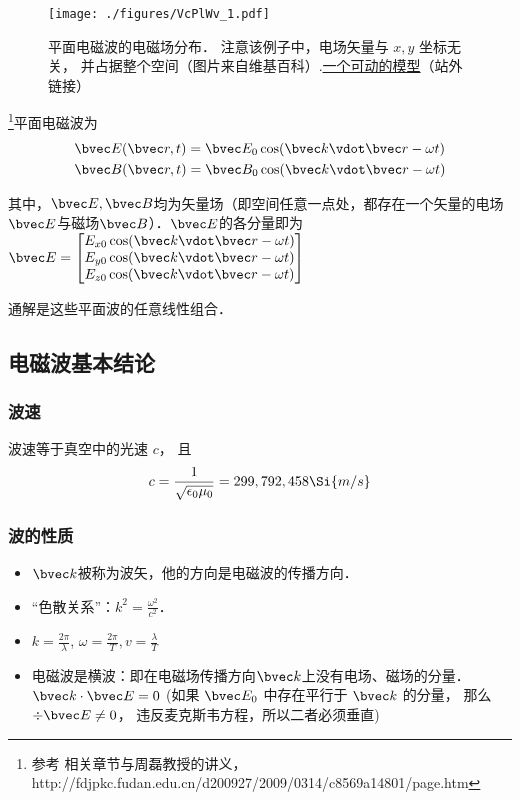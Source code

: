 

\begin{figure}[ht]
\centering
\texttt{[image: ./figures/VcPlWv\_1.pdf]}
\caption{平面电磁波的电磁场分布． 注意该例子中，电场矢量与 $x, y$ 坐标无关， 并占据整个空间（图片来自维基百科）.\href{https://www.geogebra.org/m/xhYwXSsH}{一个可动的模型}（站外链接）} \label{VcPlWv_fig1}
\end{figure}

\footnote{参考 \cite{GriffE} 相关章节与周磊教授的讲义，http://fdjpkc.fudan.edu.cn/d200927/2009/0314/c8569a14801/page.htm}平面电磁波为
\begin{align}
&\bvec E(\bvec r, t) = \bvec E_0 \cos(\bvec k\vdot \bvec r - \omega t)\\
&\bvec B(\bvec r, t) = \bvec B_0 \cos(\bvec k \vdot \bvec r - \omega t)
\end{align}

其中，$\bvec E, \bvec B$均为矢量场（即空间任意一点处，都存在一个矢量的电场$\bvec E$与磁场$\bvec B$）．$\bvec E$的各分量即为
$\bvec E = 
\begin{bmatrix}
E_{x0} \cos(\bvec k\vdot \bvec r - \omega t)\\
E_{y0} \cos(\bvec k\vdot \bvec r - \omega t)\\
E_{z0} \cos(\bvec k\vdot \bvec r - \omega t)\\
\end{bmatrix}
$

通解是这些平面波的任意线性组合． 

\subsection{电磁波基本结论}
\subsubsection{波速}
波速等于真空中的光速 $c$， 且
\begin{equation}\label{VcPlWv_eq1}
c = \frac{1}{\sqrt{\epsilon_0\mu_0}} = 299,792,458 \Si{m/s}
\end{equation}

\subsubsection{波的性质}
\begin{itemize}
\item $\bvec k$被称为波矢，他的方向是电磁波的传播方向．
\item  “色散关系”：$k^2=\frac{\omega^2}{c^2}$．
\item $k=\frac{2\pi}{\lambda}$, $\omega=\frac{2\pi}{T}, v=\frac{\lambda}{T}$
\item 电磁波是横波：即在电磁场传播方向$\bvec k$上没有电场、磁场的分量．$\bvec k \cdot \bvec E = 0$ (如果 $\bvec E_0$ 中存在平行于 $\bvec k$ 的分量， 那么 $\div \bvec E \ne 0$， 违反麦克斯韦方程，所以二者必须垂直)
\end{itemize}


